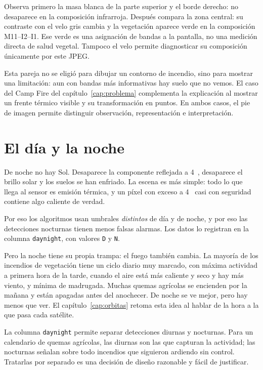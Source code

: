 Observa primero la masa blanca de la parte superior y el borde derecho: no desaparece
en la composición infrarroja. Después compara la zona central: su contraste con el velo
gris cambia y la vegetación aparece verde en la composición M11--I2--I1. Ese verde es
una asignación de bandas a la pantalla, no una medición directa de salud vegetal.
Tampoco el velo permite diagnosticar su composición únicamente por este JPEG.

Esta pareja no se eligió para dibujar un contorno de incendio, sino para mostrar una
limitación: aun con bandas más informativas hay suelo que no vemos. El caso del
Camp Fire del capítulo~\ref{cap:problema} complementa la explicación al mostrar un
frente térmico visible y su transformación en puntos. En ambos casos, el pie de
imagen permite distinguir observación, representación e interpretación.

\section{El día y la noche}

De noche no hay Sol. Desaparece la componente reflejada a 4~\um, desaparece el brillo solar y
los suelos se han enfriado. La escena es más simple: todo lo que llega al sensor es emisión
térmica, y un píxel con exceso a 4~\um{} casi con seguridad contiene algo caliente de verdad.

Por eso los algoritmos usan umbrales \emph{distintos} de día y de noche, y por eso las
detecciones nocturnas tienen menos falsas alarmas. Los datos lo registran en la columna
\texttt{daynight}, con valores \texttt{D} y \texttt{N}.

Pero la noche tiene su propia trampa: el fuego también cambia. La mayoría de los incendios de
vegetación tiene un ciclo diario muy marcado, con máxima actividad a primera hora de la tarde,
cuando el aire está más caliente y seco y hay más viento, y mínima de madrugada. Muchas quemas
agrícolas se encienden por la mañana y están apagadas antes del anochecer. De noche se ve mejor,
pero hay menos que ver. El capítulo~\ref{cap:orbitas} retoma esta idea al hablar de la hora a la
que pasa cada satélite.

\begin{parareto}
La columna \texttt{daynight} permite separar detecciones diurnas y nocturnas. Para un calendario
de quemas agrícolas, las diurnas son las que capturan la actividad; las nocturnas señalan sobre
todo incendios que siguieron ardiendo sin control. Tratarlas por separado es una decisión de
diseño razonable y fácil de justificar.
\end{parareto}

